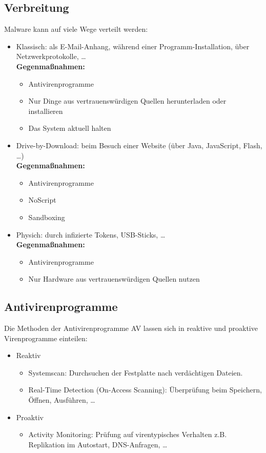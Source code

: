 	\subsection{Verbreitung}
		Malware kann auf viele Wege verteilt werden:
		\begin{itemize}
			\item Klassisch: als E-Mail-Anhang, während einer Programm-Installation, über Netzwerkprotokolle, \dots \\ \textbf{Gegenmaßnahmen:}
				\begin{itemize}
					\item Antivirenprogramme
					\item Nur Dinge aus vertrauenswürdigen Quellen herunterladen oder installieren
					\item Das System aktuell halten
				\end{itemize}
			\item Drive-by-Download: beim Besuch einer Website (über Java, JavaScript, Flash, \dots) \\ \textbf{Gegenmaßnahmen:}
				\begin{itemize}
					\item Antivirenprogramme
					\item NoScript
					\item Sandboxing
				\end{itemize}
			\item Physich: durch infizierte Tokens, USB-Sticks, \dots \\ \textbf{Gegenmaßnahmen:}
				\begin{itemize}
					\item Antivirenprogramme
					\item Nur Hardware aus vertrauenswürdigen Quellen nutzen
				\end{itemize}
		\end{itemize}

	\subsection{Antivirenprogramme}
		Die Methoden der Antivirenprogramme AV lassen sich in reaktive und proaktive Virenprogramme einteilen:
		\begin{itemize}
			\item Reaktiv
				\begin{itemize}
					\item Systemscan: Durchsuchen der Festplatte nach verdächtigen Dateien.
					\item Real-Time Detection (On-Access Scanning): Überprüfung beim Speichern, Öffnen, Ausführen, \dots
				\end{itemize}
			\item Proaktiv
				\begin{itemize}
					\item Activity Monitoring: Prüfung auf virentypisches Verhalten z.B. Replikation im Autostart, DNS-Anfragen, \dots
				\end{itemize}
		\end{itemize}

